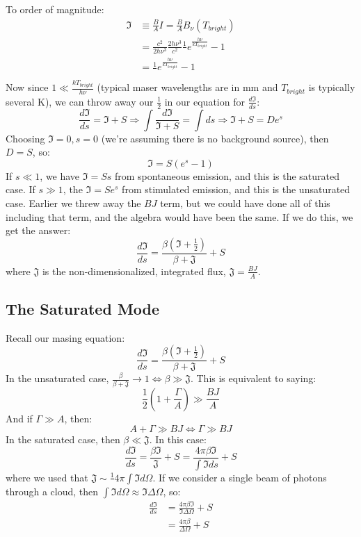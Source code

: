 \documentclass{article}
\def\inv#1{\frac1{#1}}
\def\hf{\frac12}
\def\inv#1{{\frac{1}{}#1}}
\def\hf{\frac12}
\begin{document}
To order of magnitude:
$$\begin{aligned}\mathfrak{I}&\equiv\frac{B}{A}I=\frac{B}{ A}B_\nu(T_{bright})\\ 
&=\frac{c^2}{2h\nu^3}\frac{2h\nu^3}{ c^2}\inv{e^\frac{h\nu}{ kT_{bright}}-1}\\ 
&=\inv{e^\frac{h\nu}{ kT_{bright}}-1}\\ \end{aligned}$$
Now since $1\ll\frac{kT_{bright}}{h\nu}$ (typical maser wavelengths are in
mm and $T_{bright}$ is typically several K), we can throw away our $\hf$ in
our equation for $\frac{d\mathfrak{I}}{ds}$:
$$\frac{d\mathfrak{I}}{ds}=\mathfrak{I}+S\Rightarrow
\int\frac{d\mathfrak{I}}{\mathfrak{I}+S}=\int{ds}\Rightarrow
\mathfrak{I}+S=De^s$$
Choosing $\mathfrak{I}=0, s=0$ (we're assuming there is no background source), then
$D=S$, so:
$$\boxed{\mathfrak{I}=S(e^s-1)}$$
If $s\ll1$, we have $\mathfrak{I}=Ss$ from spontaneous emission, and this is the 
saturated case.  If $s\gg1$, the $\mathfrak{I}=Se^s$ from stimulated emission, and
this is the unsaturated case.  Earlier we threw away the $BJ$ term, but we
could have done all of this including that term, and the algebra would have
been the same.  If we do this, we get the answer:
$$\boxed{\frac{d\mathfrak{I}}{ ds}=\frac{\beta(\mathfrak{I}+\hf)}{\beta+\mathfrak{J}}+S}$$
where $\mathfrak{J}$ is the non-dimensionalized, integrated flux, 
$\mathfrak{J}=\frac{BJ}{ A}$.

\subsection{ The Saturated Mode }

Recall our masing equation:
$$\frac{d\mathfrak{I}}{ ds}=\frac{\beta(\mathfrak{I}+\hf)}{\beta+\mathfrak{J}}+S$$
In the unsaturated case, $\frac{\beta}{\beta+\mathfrak{J}}\to1\iff\beta\gg\mathfrak{J}$.
This is equivalent to saying:
$$\hf\left(1+\frac{\Gamma}{ A}\right)\gg\frac{BJ}{ A}$$
And if $\Gamma\gg A$, then:
$$A+\Gamma\gg BJ\iff\Gamma\gg BJ$$
In the saturated case, then $\beta\ll\mathfrak{J}$.  In this case:
$$\frac{d\mathfrak{I}}{ds}=\frac{\beta\mathfrak{I}}{\mathfrak{J}}+S=\frac{4\pi\beta\mathfrak{I}}{
\int{\mathfrak{I}ds}}+S$$
where we used that $\mathfrak{J}\sim\inv{4\pi}\int{\mathfrak{I}d\Omega}$.  If we consider
a single beam of photons through a cloud, then $\int{\mathfrak{I}d\Omega}\approx
\mathfrak{I}\Delta\Omega$, so:
$$\boxed{
\begin{aligned}\frac{d\mathfrak{I}}{ ds}&=\frac{4\pi\beta\mathfrak{I}}{\mathfrak{I}\Delta\Omega}+S\\ 
&=\frac{4\pi\beta}{\Delta\Omega}+S\\ \end{aligned}}$$
\end{document}
